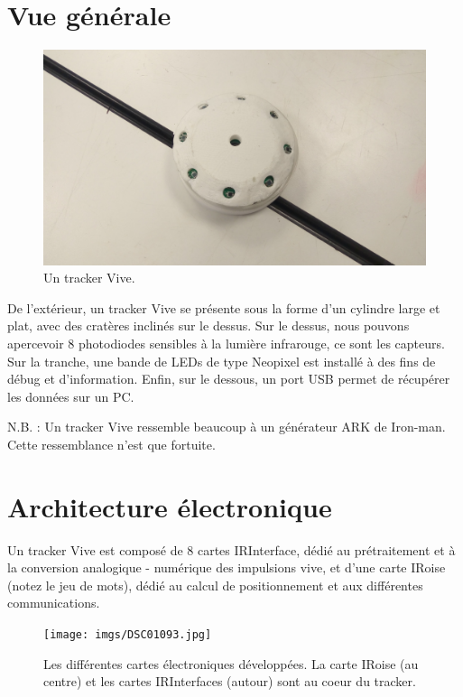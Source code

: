 ﻿\section{Vue générale}

\begin{figure}[h]
\begin{center}
\includegraphics[scale=0.05]{imgs/IMG_20180525_120520.jpg}
\end{center}
\caption{Un tracker Vive.}
\end{figure}

De l'extérieur, un tracker Vive se présente sous la forme d'un cylindre large et plat, avec des cratères inclinés sur le dessus. Sur le dessus, nous pouvons apercevoir 8 photodiodes sensibles à la lumière infrarouge, ce sont les capteurs. Sur la tranche, une bande de LEDs de type Neopixel est installé à des fins de débug et d'information. Enfin, sur le dessous, un port USB permet de récupérer les données sur un PC.

N.B. : Un tracker Vive ressemble beaucoup à un générateur ARK de Iron-man. Cette ressemblance n'est que fortuite.

\section{Architecture électronique}

Un tracker Vive est composé de 8 cartes IRInterface, dédié au prétraitement et à la conversion analogique - numérique des impulsions vive, et d'une carte IRoise (notez le jeu de mots), dédié au calcul de positionnement et aux différentes communications.

\begin{figure}[h]
\begin{center}
\texttt{[image: imgs/DSC01093.jpg]}
\end{center}
\caption{Les différentes cartes électroniques développées. La carte IRoise (au centre) et les cartes IRInterfaces (autour) sont au coeur du tracker.}
\end{figure}

